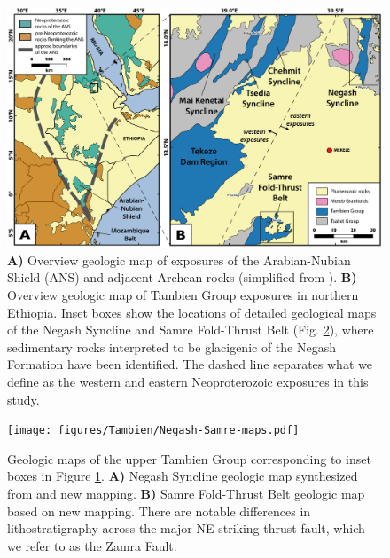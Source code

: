 \begin{figure}[h!]
\begin{center}
	\includegraphics[width=\textwidth]{figures/Tambien/overview-map.pdf}
	\caption[Overview geologic map of the Arabian-Nubian Shield.]{\textbf{A)} Overview geologic map of exposures of the Arabian-Nubian Shield (ANS) and adjacent Archean rocks (simplified from \citealp{Johnson2014a}). \textbf{B)} Overview geologic map of Tambien Group exposures in northern Ethiopia. Inset boxes show the locations of detailed geological maps of the Negash Syncline and Samre Fold-Thrust Belt (Fig. \ref{fig:Negash-Samre-maps}), where sedimentary rocks interpreted to be glacigenic of the Negash Formation have been identified. The dashed line separates what we define as the western and eastern Neoproterozoic exposures in this study.}
	\label{fig:overview-map}
\end{center}
\end{figure}

\begin{figure}[h!]
\begin{center}
	\texttt{[image: figures/Tambien/Negash-Samre-maps.pdf]}
	\caption[Geologic maps of the upper Tambien Group.]{Geologic maps of the upper Tambien Group corresponding to inset boxes in Figure \ref{fig:overview-map}. \textbf{A)} Negash Syncline geologic map synthesized from \citet{Beyth2003a} and new mapping. \textbf{B)} Samre Fold-Thrust Belt geologic map based on new mapping. There are notable differences in lithostratigraphy across the major NE-striking thrust fault, which we refer to as the Zamra Fault.}
	\label{fig:Negash-Samre-maps}
\end{center}
\end{figure}

